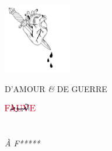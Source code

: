 \documentclass[a5paper,10pt,twoside,french]{book}
\begin{document}
  \maketitle

  \frontmatter

{
\thispagestyle{empty}
\chapter*{}
\thispagestyle{empty}

  \null\vfill           %
    \begin{center}
      \includegraphics[width=3cm]{coeur-poignarde-monochrome.pdf}
 
      \LARGE {D’AMOUR \emph{\&} DE GUERRE}

      \vspace*{20pt}

      \large { \includegraphics[height=1em]{logo-rouge-sur-noir.pdf} }
    \end{center}
    \vspace*{150pt}
  \vfill                %

}
{
\thispagestyle{empty}
\chapter*{}
\thispagestyle{empty}

  \null\vfill           %
    \begin{flushright}
      \emph{%
      À F*****
      }
    \end{flushright}
  \vspace*{130pt}
  \vfill                %
}

  \mainmatter

  \backmatter
  \cleardoublepage
\end{document}
